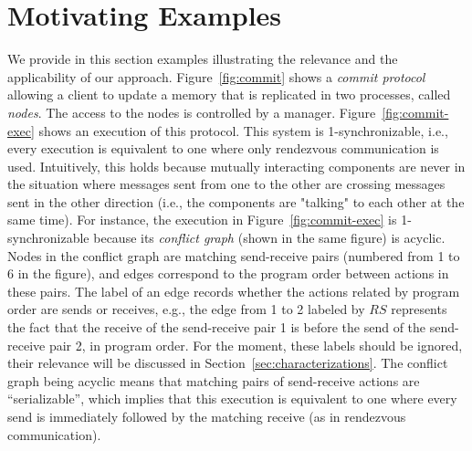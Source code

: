 \section{Motivating Examples}
\label{sec:motivation}

%
%
%
%
%
%

We provide in this section examples illustrating the relevance and the applicability of our approach. %
Figure~\ref{fig:commit} shows a {\em commit protocol} allowing a client to update a memory that is replicated in two processes, called \emph{nodes}. The access to the nodes is controlled by a manager. Figure~\ref{fig:commit-exec} shows an execution of this protocol. This system is 1-synchronizable, i.e., every execution is equivalent to one where only rendezvous communication is used. Intuitively, this holds because mutually interacting components are never in the situation where messages sent from one to the other are crossing messages sent in the other direction (i.e., the components are "talking" to each other at the same time). For instance, the execution in Figure~\ref{fig:commit-exec} is 1-synchronizable because its \emph{conflict graph} (shown in the same figure) is acyclic. Nodes in the conflict graph are matching send-receive pairs (numbered from 1 to 6 in the figure), and edges correspond to the program order between actions in these pairs. The label of an edge records whether the actions related by program order are sends or receives, e.g., the edge from 1 to 2 labeled by $RS$ represents the fact that the receive of the send-receive pair 1 is before the send of the send-receive pair 2, in program order. For the moment, these labels should be ignored, their relevance will be discussed in Section~\ref{sec:characterizations}.
The conflict graph being acyclic means that matching pairs of send-receive actions are ``serializable'', which implies that this execution is equivalent to one where every send is immediately followed by the matching receive (as in rendezvous communication).

